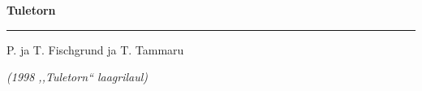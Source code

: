 \documentclass[10pt]{book}
\begin{document}
{
  \samepage
  \raggedbottom
  \raggedright
  \sloppy


  \vspace{0.2in}
    \centerline{
      \bfseries
      \large Tuletorn
    }
  \nopagebreak[4]
  \vspace{0.1in}
  \nopagebreak[4]
  \hrule height 0.05ex
  \nopagebreak[4]
  \vspace{-0.05in}

  {\footnotesize  \hfill P. ja T. Fischgrund ja T. Tammaru }\\
  \vspace{0.01in}

  {\em {\footnotesize (1998 ,,Tuletorn{``} laagrilaul) } }
  \vspace{0.01in}


}
\end{document}
